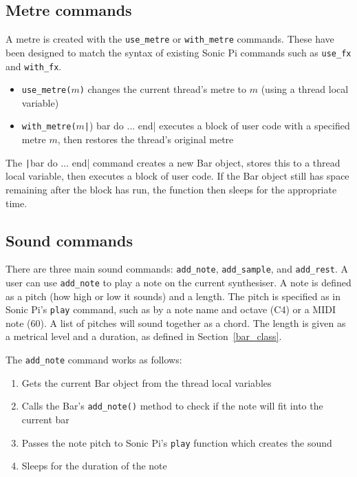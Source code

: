 \documentclass[12pt,twoside,openright]{report}
\begin{document}
\subsection{Metre commands} \label{metre_commands}

A metre is created with the \verb'use_metre' or \verb'with_metre' commands. These have been
designed to match the syntax of existing Sonic Pi commands such as \verb'use_fx' and \verb'with_fx'.

\begin{itemize}
	\item \verb'use_metre('$m$\verb')' changes the current thread's metre to $m$ (using a thread local variable)
	\item \verb'with_metre('$m$\texttt|) bar do ... end| executes a block of user code with a
specified metre $m$, then restores the thread's original metre
\end{itemize}

The \texttt|bar do ... end| command creates a new Bar object, stores this to a
thread local variable, then executes a block of user code. If the Bar object
still has space remaining after the block has run, the function then sleeps for
the appropriate time.


\subsection{Sound commands} \label{sound_commands}

There are three main sound commands: \verb'add_note', \verb'add_sample', and \verb'add_rest'. A
user can use \verb'add_note' to play a note on the current synthesiser. A note is
defined as a pitch (how high or low it sounds) and a length. The pitch is
specified as in Sonic Pi's \verb'play' command, such as by a note name and octave (C4)
or a MIDI note (60). A list of pitches will sound together as a chord. The
length is given as a metrical level and a duration, as defined in Section~\ref{bar_class}.

The \verb'add_note' command works as follows:
\begin{enumerate}
    \item Gets the current Bar object from the thread local variables
    \item Calls the Bar's \verb'add_note()' method to check if the note will fit into the current bar
    \item Passes the note pitch to Sonic Pi's \verb'play' function which creates the sound
    \item Sleeps for the duration of the note
\end{enumerate}
\end{document}
